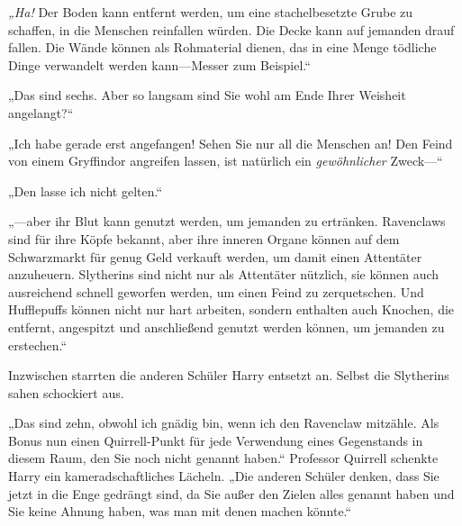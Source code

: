 \emph{„Ha!} Der Boden kann entfernt werden, um eine stachelbesetzte Grube zu schaffen, in die Menschen reinfallen würden. Die Decke kann auf jemanden drauf fallen. Die Wände können als Rohmaterial dienen, das in eine Menge tödliche Dinge verwandelt werden kann—Messer zum Beispiel.“

„Das sind sechs. Aber so langsam sind Sie wohl am Ende Ihrer Weisheit angelangt?“

„Ich habe gerade erst angefangen! Sehen Sie nur all die Menschen an! Den Feind von einem Gryffindor angreifen lassen, ist natürlich ein \emph{gewöhnlicher} Zweck—“

„Den lasse ich nicht gelten.“

„—aber ihr Blut kann genutzt werden, um jemanden zu ertränken. Ravenclaws sind für ihre Köpfe bekannt, aber ihre inneren Organe können auf dem Schwarzmarkt für genug Geld verkauft werden, um damit einen Attentäter anzuheuern. Slytherins sind nicht nur als Attentäter nützlich, sie können auch ausreichend schnell geworfen werden, um einen Feind zu zerquetschen. Und Hufflepuffs können nicht nur hart arbeiten, sondern enthalten auch Knochen, die entfernt, angespitzt und anschließend genutzt werden können, um jemanden zu erstechen.“

Inzwischen starrten die anderen Schüler Harry entsetzt an. Selbst die Slytherins sahen schockiert aus.

„Das sind zehn, obwohl ich gnädig bin, wenn ich den Ravenclaw mitzähle. Als Bonus nun einen Quirrell-Punkt für jede Verwendung eines Gegenstands in diesem Raum, den Sie noch nicht genannt haben.“ Professor Quirrell schenkte Harry ein kameradschaftliches Lächeln. „Die anderen Schüler denken, dass Sie jetzt in die Enge gedrängt sind, da Sie außer den Zielen alles genannt haben und Sie keine Ahnung haben, was man mit denen machen könnte.“

